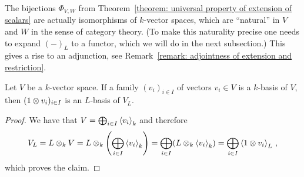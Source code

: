 \begin{remark}
  The bijections $\Phi_{V,W}$ from Theorem~\ref{theorem: universal property of extension of scalars} are actually isomorphisms of $k$-vector spaces, which are \enquote{natural} in $V$ and $W$ in the sense of category theory.
  (To make this naturality precise one needs to expand $(-)_L$ to a functor, which we will do in the next subsection.)
  This gives a rise to an adjunction, see Remark~\ref{remark: adjointness of extension and restriction}.
\end{remark}


\begin{lemma}
  \label{lemma: bases under extension of scalars}
  Let $V$ be a $k$-vector space.
  If a family $(v_i)_{i \in I}$ of vectors $v_i \in V$ is a $k$-basis of $V$, then $(1 \mathbin{\otimes} v_i)_{i \in I}$ is an $L$-basis of $V_L$.
\end{lemma}


\begin{proof}
  We have that $V = \bigoplus_{i \in I} \left\langle v_i \right\rangle_k$ and therefore
  \[
      V_L
    = L \mathbin{\otimes}_k V
    = L \mathbin{\otimes}_k \left( \bigoplus_{i \in I} \left\langle v_i \right\rangle_k \right)
    = \bigoplus_{i \in I} (L \mathbin{\otimes}_k \left\langle v_i \right\rangle_k)
    = \bigoplus_{i \in I} \left\langle 1 \mathbin{\otimes} v_i \right\rangle_L \,,
  \]
  which proves the claim.
\end{proof}


